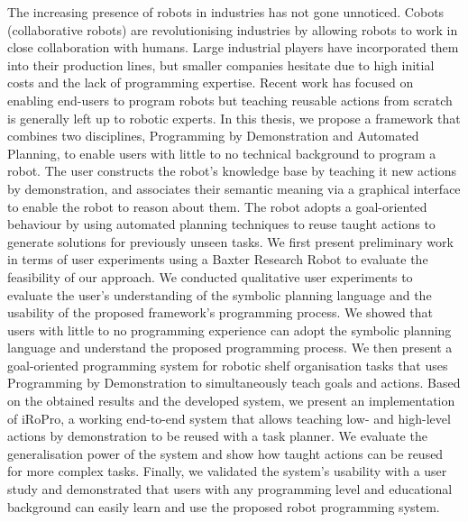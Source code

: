 The increasing presence of robots in industries has not gone unnoticed. 
Cobots (collaborative robots) are revolutionising industries by allowing robots to work in close collaboration with humans.
Large industrial players have incorporated them into their production lines, but smaller companies hesitate due to high initial costs and the lack of programming expertise. 
Recent work has focused on enabling end-users to program robots but teaching reusable actions from scratch is generally left up to robotic experts.
In this thesis, we propose a framework that combines two disciplines, Programming by Demonstration and Automated Planning, to enable users with little to no technical background to program a robot. 
The user constructs the robot's knowledge base by teaching it new actions by demonstration, and associates their semantic meaning via a graphical interface to enable the robot to reason about them. 
The robot adopts a goal-oriented behaviour by using automated planning techniques to reuse taught actions to generate solutions for previously unseen tasks.
We first present preliminary work in terms of user experiments using a Baxter Research Robot to evaluate the feasibility of our approach.
We conducted qualitative user experiments to evaluate the user's understanding of the symbolic planning language and the usability of the proposed framework's programming process.
We showed that users with little to no programming experience can adopt the symbolic planning language and understand the proposed programming process.
We then present a goal-oriented programming system for robotic shelf organisation tasks that uses Programming by Demonstration to simultaneously teach goals and actions.
Based on the obtained results and the developed system, we present an implementation of iRoPro, a working end-to-end system that allows teaching low- and high-level actions by demonstration to be reused with a task planner.
We evaluate the generalisation power of the system and show how taught actions can be reused for more complex tasks.
Finally, we validated the system's usability with a user study and demonstrated that users with any programming level and educational background can easily learn and use the proposed robot programming system.


